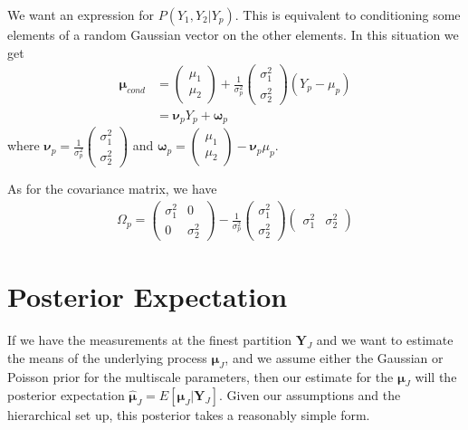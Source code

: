 \documentclass[a4paper,12pt]{article}
\theoremstyle{definition}
\begin{document}
We want an expression for $P(Y_1, Y_2 | Y_p)$. This is equivalent to conditioning some elements of a random Gaussian vector on the other elements. In this situation we get
\begin{align*}
	\boldsymbol{\mu}_{cond} &= 	\begin{pmatrix}
																\mu_1 \\
																\mu_2
															\end{pmatrix}
															+ \frac{1}{\sigma_p^2}
															\begin{pmatrix}
																\sigma_1^2 \\
																\sigma_2^2
															\end{pmatrix}
															(Y_p - \mu_p) \\
													&=	\boldsymbol{\nu}_p Y_p + \boldsymbol{\omega}_p
\end{align*}
where $\boldsymbol{\nu}_p = \frac{1}{\sigma_p^2} \begin{pmatrix} \sigma_1^2 \\ \sigma_2^2 \end{pmatrix}$ and $\boldsymbol{\omega}_p = \begin{pmatrix} \mu_1 \\ \mu_2 \end{pmatrix} - \boldsymbol{\nu}_p \mu_p$.

As for the covariance matrix, we have
\begin{align*}
 	\Omega_p	=	\begin{pmatrix}
								\sigma_1^2	&	0						\\
								0						&	\sigma_2^2
							\end{pmatrix}
							- \frac{1}{\sigma_p^2}
							\begin{pmatrix}
								\sigma_1^2 \\
								\sigma_2^2
							\end{pmatrix}
							\begin{pmatrix}
								\sigma_1^2 &	\sigma_2^2
							\end{pmatrix}
\end{align*}

\section{Posterior Expectation}
If we have the measurements at the finest partition $\mathbf{Y}_{J}$ and we want to estimate the means of the underlying process $\boldsymbol{\mu}_J$, and we assume either the Gaussian or Poisson prior for the multiscale parameters, then our estimate for the $\boldsymbol{\mu}_J$ will the posterior expectation $\hat{\boldsymbol{\mu}}_J = E[\boldsymbol{\mu}_J | \boldsymbol{Y}_J]$. Given our assumptions and the hierarchical set up, this posterior takes a reasonably simple form.
\end{document}
